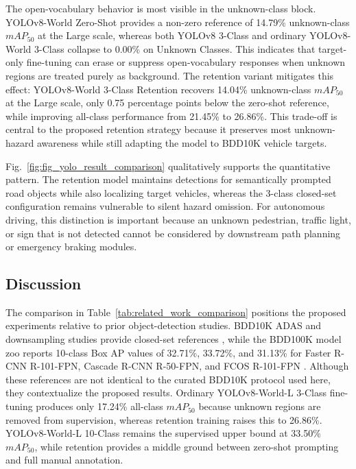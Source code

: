 \documentclass[conference]{IEEEtran}
\begin{document}
The open-vocabulary behavior is most visible in the unknown-class block. YOLOv8-World Zero-Shot provides a non-zero reference of 14.79\% unknown-class $mAP_{50}$ at the Large scale, whereas both YOLOv8 3-Class and ordinary YOLOv8-World 3-Class collapse to 0.00\% on Unknown Classes. This indicates that target-only fine-tuning can erase or suppress open-vocabulary responses when unknown regions are treated purely as background. The retention variant mitigates this effect: YOLOv8-World 3-Class Retention recovers 14.04\% unknown-class $mAP_{50}$ at the Large scale, only 0.75 percentage points below the zero-shot reference, while improving all-class performance from 21.45\% to 26.86\%. This trade-off is central to the proposed retention strategy because it preserves most unknown-hazard awareness while still adapting the model to BDD10K vehicle targets.

Fig.~\ref{fig:fig_yolo_result_comparison} qualitatively supports the quantitative pattern. The retention model maintains detections for semantically prompted road objects while also localizing target vehicles, whereas the 3-class closed-set configuration remains vulnerable to silent hazard omission. For autonomous driving, this distinction is important because an unknown pedestrian, traffic light, or sign that is not detected cannot be considered by downstream path planning or emergency braking modules.

\subsection{Discussion}



The comparison in Table~\ref{tab:related_work_comparison} positions the proposed experiments relative to prior object-detection studies. BDD10K ADAS and downsampling studies provide closed-set references \cite{10605392,11376542}, while the BDD100K model zoo reports 10-class Box AP values of 32.71\%, 33.72\%, and 31.13\% for Faster R-CNN R-101-FPN, Cascade R-CNN R-50-FPN, and FCOS R-101-FPN \cite{bdd100kModelZoo}. Although these references are not identical to the curated BDD10K protocol used here, they contextualize the proposed results. Ordinary YOLOv8-World-L 3-Class fine-tuning produces only 17.24\% all-class $mAP_{50}$ because unknown regions are removed from supervision, whereas retention training raises this to 26.86\%. YOLOv8-World-L 10-Class remains the supervised upper bound at 33.50\% $mAP_{50}$, while retention provides a middle ground between zero-shot prompting and full manual annotation.
\end{document}
